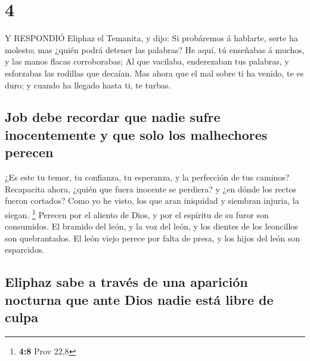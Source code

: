 \hypertarget{section-3}{%
\section{4}\label{section-3}}

 Y RESPONDIÓ Eliphaz el Temanita, y dijo:  Si
probáremos á hablarte, serte ha molesto; mas ¿quién podrá detener las
palabras?  He aquí, tú enseñabas á muchos, y las manos
flacas corroborabas;  Al que vacilaba, enderezaban tus
palabras, y esforzabas las rodillas que decaían.  Mas ahora
que el mal sobre ti ha venido, te es duro; y cuando ha llegado hasta ti,
te turbas.

\hypertarget{job-debe-recordar-que-nadie-sufre-inocentemente-y-que-solo-los-malhechores-perecen}{%
\subsection{Job debe recordar que nadie sufre inocentemente y que solo
los malhechores
perecen}\label{job-debe-recordar-que-nadie-sufre-inocentemente-y-que-solo-los-malhechores-perecen}}

 ¿Es este tu temor, tu confianza, tu esperanza, y la
perfección de tus caminos?  Recapacita ahora, ¿quién que
fuera inocente se perdiera? y ¿en dónde los rectos fueron cortados?
 Como yo he visto, los que aran iniquidad y siembran
injuria, la siegan. \footnote{\textbf{4:8} Prov 22,8} 
Perecen por el aliento de Dios, y por el espíritu de su furor son
consumidos.  El bramido del león, y la voz del león, y los
dientes de los leoncillos son quebrantados.  El león viejo
perece por falta de presa, y los hijos del león son esparcidos.

\hypertarget{eliphaz-sabe-a-travuxe9s-de-una-apariciuxf3n-nocturna-que-ante-dios-nadie-estuxe1-libre-de-culpa}{%
\subsection{Eliphaz sabe a través de una aparición nocturna que ante
Dios nadie está libre de
culpa}\label{eliphaz-sabe-a-travuxe9s-de-una-apariciuxf3n-nocturna-que-ante-dios-nadie-estuxe1-libre-de-culpa}}

